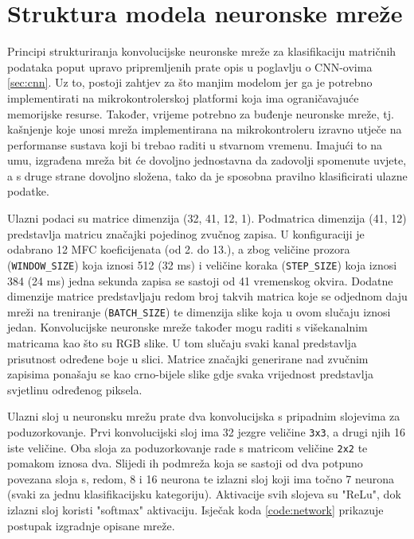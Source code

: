 \section{Struktura modela neuronske mreže}

Principi strukturiranja konvolucijske neuronske mreže za klasifikaciju matričnih podataka
poput upravo pripremljenih prate opis u poglavlju o CNN-ovima \ref{sec:cnn}.
Uz to, postoji zahtjev za što manjim modelom jer ga je potrebno implementirati na 
mikrokontrolerskoj platformi koja ima ograničavajuće memorijske resurse. Također,
vrijeme potrebno za buđenje neuronske mreže, tj. kašnjenje koje unosi mreža
implementirana na mikrokontroleru izravno utječe na performanse sustava 
koji bi trebao raditi u stvarnom vremenu. Imajući to na umu, izgrađena
mreža bit će dovoljno jednostavna da zadovolji spomenute uvjete, a s druge strane dovoljno
složena, tako da je sposobna pravilno klasificirati ulazne podatke.

Ulazni podaci su matrice dimenzija (32, 41, 12, 1). Podmatrica dimenzija (41, 12) 
predstavlja matricu značajki pojedinog zvučnog zapisa. U konfiguraciji je odabrano 
12 MFC koeficijenata (od 2. do 13.), a zbog veličine prozora (\texttt{WINDOW\_SIZE}) 
koja iznosi 512 (32 ms) i veličine koraka (\texttt{STEP\_SIZE}) koja iznosi 384 (24 ms)
jedna sekunda zapisa se sastoji od 41 vremenskog okvira. Dodatne dimenzije matrice
predstavljaju redom broj takvih matrica koje se odjednom daju mreži na treniranje 
(\texttt{BATCH\_SIZE}) te dimenzija slike koja u ovom slučaju iznosi jedan. Konvolucijske
neuronske mreže također mogu raditi s višekanalnim matricama kao što su RGB slike. U tom 
slučaju svaki kanal predstavlja prisutnost određene boje u slici. Matrice značajki
generirane nad zvučnim zapisima ponašaju se kao crno-bijele slike gdje svaka vrijednost
predstavlja svjetlinu određenog piksela.

Ulazni sloj u neuronsku mrežu prate dva konvolucijska s pripadnim slojevima za
poduzorkovanje. Prvi konvolucijski sloj ima 32 jezgre veličine \texttt{3x3},
a drugi njih 16 iste veličine. Oba sloja za poduzorkovanje rade s matricom
veličine \texttt{2x2} te pomakom iznosa dva. Slijedi ih podmreža koja se sastoji 
od dva potpuno povezana sloja 
s, redom, 8 i 16 neurona te izlazni sloj koji ima točno 7 neurona (svaki za jednu
klasifikacijsku kategoriju). Aktivacije svih slojeva su "ReLu", dok izlazni sloj
koristi "softmax" aktivaciju. Isječak koda \ref{code:network} prikazuje postupak
izgradnje opisane mreže.

